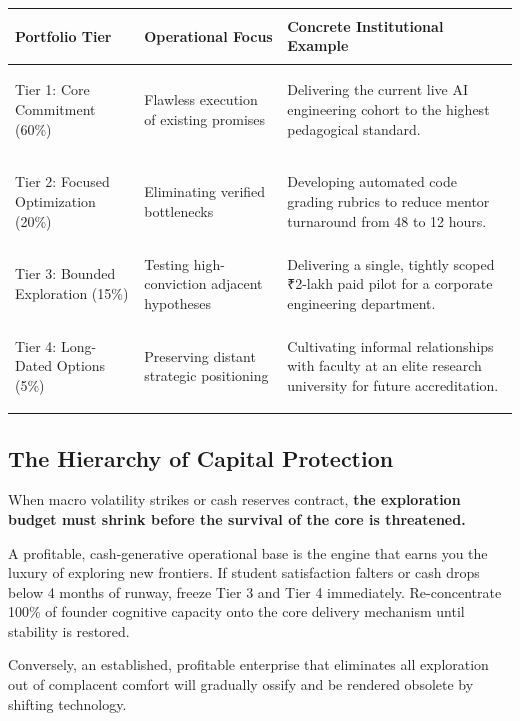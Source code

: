 \begin{tcolorbox}[
  enhanced,
  colback=BayesSurface!60,
  colframe=BayesBorder,
  boxrule=0.5pt,
  arc=3pt,
  left=3pt,right=3pt,top=3pt,bottom=3pt,
  boxsep=1pt
]
\scriptsize
\begin{tabularx}{\linewidth}{>{\bfseries\raggedright\arraybackslash}p{2.3cm} X X}
\toprule
\textbf{Portfolio Tier} & \textbf{Operational Focus} & \textbf{Concrete Institutional Example} \\
\midrule
Tier 1: Core Commitment (60\%) & Flawless execution of existing promises & Delivering the current live AI engineering cohort to the highest pedagogical standard. \\
\addlinespace[2pt]
Tier 2: Focused Optimization (20\%) & Eliminating verified bottlenecks & Developing automated code grading rubrics to reduce mentor turnaround from 48 to 12 hours. \\
\addlinespace[2pt]
Tier 3: Bounded Exploration (15\%) & Testing high-conviction adjacent hypotheses & Delivering a single, tightly scoped ₹2-lakh paid pilot for a corporate engineering department. \\
\addlinespace[2pt]
Tier 4: Long-Dated Options (5\%) & Preserving distant strategic positioning & Cultivating informal relationships with faculty at an elite research university for future accreditation. \\
\bottomrule
\end{tabularx}
\end{tcolorbox}

\subsection{The Hierarchy of Capital Protection}

When macro volatility strikes or cash reserves contract, \textbf{the exploration budget must shrink before the survival of the core is threatened.}

A profitable, cash-generative operational base is the engine that earns you the luxury of exploring new frontiers. If student satisfaction falters or cash drops below 4 months of runway, freeze Tier 3 and Tier 4 immediately. Re-concentrate 100\% of founder cognitive capacity onto the core delivery mechanism until stability is restored.

Conversely, an established, profitable enterprise that eliminates all exploration out of complacent comfort will gradually ossify and be rendered obsolete by shifting technology.


